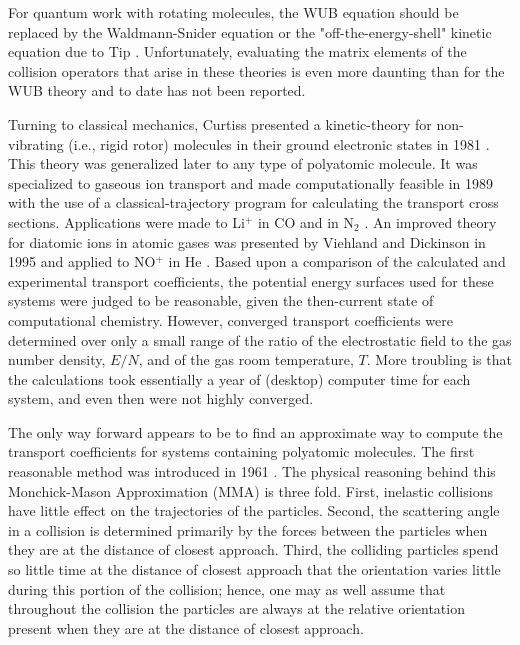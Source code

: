 \documentclass[article]{revtex4-2}
\begin{document}
For quantum work with rotating molecules, the WUB equation should be replaced by the Waldmann-Snider equation \cite{Waldmann1957,Waldmann1958,Snider1960} or the "off-the-energy-shell" kinetic equation due to Tip \cite{Tip1971a,Tip1971b}.  Unfortunately, evaluating the matrix elements of the collision operators that arise in these theories is even more daunting than for the WUB theory and to date has not been reported.

Turning to classical mechanics, Curtiss presented a kinetic-theory for non-vibrating (i.e., rigid rotor) molecules in their ground electronic states in 1981 \cite{Curtiss1981}.  This theory was generalized later \cite{Curtiss1992} to any type of polyatomic molecule.  It was specialized \cite{Viehland1986} to gaseous ion transport and made computationally feasible in 1989 \cite{Viehland1989} with the use of a classical-trajectory program \cite{Dickinson1985a,Dickinson1985b,Dickinson1986} for calculating the transport cross sections. Applications were made to Li$^+$ in CO \cite{Viehland1994} and in N$_2$ \cite{Viehland1994,Viehland1995}. An improved theory for diatomic ions in atomic gases was presented by Viehland and Dickinson in 1995 \cite{Viehland1995} and applied to NO$^+$ in He \cite{Viehland1996}. Based upon a comparison of the calculated and experimental transport coefficients, the potential energy surfaces used for these systems were judged to be reasonable, given the then-current state of computational chemistry. However, converged transport coefficients were determined over only a small range of the ratio of the electrostatic field to the gas number density, $E/N$, and of the gas room temperature, $T$.  More troubling is that the calculations took essentially a year of (desktop) computer time for each system, and even then were not highly converged.

The only way forward appears to be to find an approximate way to compute the transport coefficients for systems containing polyatomic molecules.  The first reasonable method was introduced in 1961 \cite{monchick1961}. The physical reasoning behind this Monchick-Mason Approximation (MMA) is three fold.  First, inelastic collisions have little effect on the trajectories of the particles. Second, the scattering angle in a collision is determined primarily by the forces between the particles when they are at the distance of closest approach. Third, the colliding particles spend so little time at the distance of closest approach that the orientation varies little during this portion of the collision; hence, one may as well assume that throughout the collision the particles are always at the relative orientation present when they are at the distance of closest approach.
\end{document}
